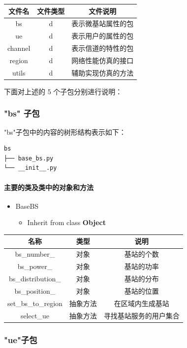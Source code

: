 \documentclass[11pt]{article}
\providecommand{\tightlist}{%
      \setlength{\itemsep}{0pt}\setlength{\parskip}{0pt}}
\begin{document}
\begin{longtable}[c]{@{}ccc@{}}
\toprule
文件名 & 文件类型 & 文件说明\tabularnewline
\midrule
\endhead
bs & d & 表示微基站属性的包\tabularnewline
ue & d & 表示用户的属性的包\tabularnewline
channel & d & 表示信道的特性的包\tabularnewline
region & d & 网络性能仿真的接口\tabularnewline
utils & d & 辅助实现仿真的方法\tabularnewline
\bottomrule
\end{longtable}

下面对上述的 5 个子包分别进行说明：

\subsubsection{"bs" 子包}\label{bs-ux5b50ux5305}

"bs"子包中的内容的树形结构表示如下：

\begin{verbatim}
bs
├── base_bs.py
└── __init__.py
\end{verbatim}

\paragraph{主要的类及类中的对象和方法}\label{ux4e3bux8981ux7684ux7c7bux53caux7c7bux4e2dux7684ux5bf9ux8c61ux548cux65b9ux6cd5}

\begin{itemize}
\tightlist
\item
  BaseBS

  \begin{itemize}
  \tightlist
  \item
    Inherit from class \textbf{Object}
  \end{itemize}
\end{itemize}

\begin{longtable}[c]{@{}ccc@{}}
\toprule
名称 & 类型 & 说明\tabularnewline
\midrule
\endhead
bs\_number\_ & 对象 & 基站的个数\tabularnewline
bs\_power\_ & 对象 & 基站的功率\tabularnewline
bs\_distribution\_ & 对象 & 基站的分布\tabularnewline
bs\_position\_ & 对象 & 基站的位置\tabularnewline
set\_bs\_to\_region & 抽象方法 & 在区域内生成基站\tabularnewline
select\_ue & 抽象方法 & 寻找基站服务的用户集合\tabularnewline
\bottomrule
\end{longtable}

\subsubsection{"ue"子包}\label{ueux5b50ux5305}
\end{document}
